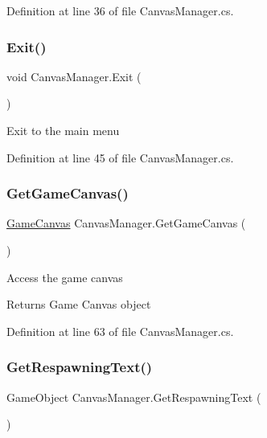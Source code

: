 Definition at line 36 of file Canvas\+Manager.\+cs.

\mbox{\label{class_canvas_manager_afade6015b931715904f021bc554b65fd}} 
\subsubsection{\texorpdfstring{Exit()}{Exit()}}
{\footnotesize\ttfamily void Canvas\+Manager.\+Exit (\begin{DoxyParamCaption}{ }\end{DoxyParamCaption})}



Exit to the main menu 



Definition at line 45 of file Canvas\+Manager.\+cs.

\mbox{\label{class_canvas_manager_a4ca7162730ba189ec52a772fda4f9a3c}} 
\subsubsection{\texorpdfstring{Get\+Game\+Canvas()}{GetGameCanvas()}}
{\footnotesize\ttfamily \mbox{\hyperlink{class_game_canvas}{Game\+Canvas}} Canvas\+Manager.\+Get\+Game\+Canvas (\begin{DoxyParamCaption}{ }\end{DoxyParamCaption})}



Access the game canvas 

\begin{DoxyReturn}{Returns}
Game Canvas object
\end{DoxyReturn}


Definition at line 63 of file Canvas\+Manager.\+cs.

\mbox{\label{class_canvas_manager_a029e8183db87b6aa06be208735aff5c6}} 
\subsubsection{\texorpdfstring{Get\+Respawning\+Text()}{GetRespawningText()}}
{\footnotesize\ttfamily Game\+Object Canvas\+Manager.\+Get\+Respawning\+Text (\begin{DoxyParamCaption}{ }\end{DoxyParamCaption})}



